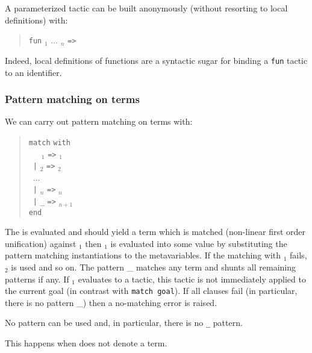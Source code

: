 A parameterized tactic can be built anonymously (without resorting to
local definitions) with:
\begin{quote}
{\tt fun} {\ident${}_1$} ... {\ident${}_n$} {\tt =>} {\tacexpr}
\end{quote}
Indeed, local definitions of functions are a syntactic sugar for
binding a {\tt fun} tactic to an identifier.

\subsubsection{Pattern matching on terms}

We can carry out pattern matching on terms with:
\begin{quote}
{\tt match} {\tacexpr} {\tt with}\\
~~~{\cpattern}$_1$ {\tt =>} {\tacexpr}$_1$\\
~{\tt |} {\cpattern}$_2$ {\tt =>} {\tacexpr}$_2$\\
~...\\
~{\tt |} {\cpattern}$_n$ {\tt =>} {\tacexpr}$_n$\\
~{\tt |} {\tt \_} {\tt =>} {\tacexpr}$_{n+1}$\\
{\tt end}
\end{quote}
The {\tacexpr} is evaluated and should yield a term which is matched
(non-linear first order unification) against {\cpattern}$_1$ then
{\tacexpr}$_1$ is evaluated into some value by substituting the
pattern matching instantiations to the metavariables. If the matching
with {\cpattern}$_1$ fails, {\cpattern}$_2$ is used and so on.  The
pattern {\_} matches any term and shunts all remaining patterns if
any. If {\tacexpr}$_1$ evaluates to a tactic, this tactic is not
immediately applied to the current goal (in contrast with {\tt match
goal}). If all clauses fail (in particular, there is no pattern {\_})
then a no-matching error is raised.

\begin{ErrMsgs}

\item {}

  No pattern can be used and, in particular, there is no {\tt \_} pattern.

\item {}

  This happens when {\tacexpr} does not denote a term.

\end{ErrMsgs}

